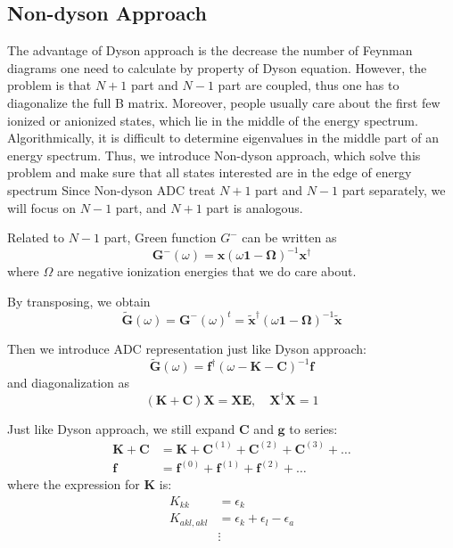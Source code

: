\subsection{Non-dyson Approach}
The advantage of Dyson approach is the decrease the number of Feynman diagrams one need to calculate by property of Dyson equation.
However, the problem is that $N+1$ part and $N-1$ part are coupled, thus one has to diagonalize the full B matrix.
Moreover, people usually care about the first few ionized or anionized states, which lie in the middle of the energy spectrum.
Algorithmically, it is difficult to determine eigenvalues in the middle part of an energy spectrum.
Thus, we introduce Non-dyson approach, which solve this problem and make sure that all states interested are in the edge of energy spectrum
Since Non-dyson ADC treat $N+1$ part and $N-1$ part separately, we will focus on $N-1$ part, and $N+1$ part is analogous.

Related to $N-1$ part, Green function $G^{-}$ can be written as
\begin{equation}
	\boldsymbol{G}^{-}(\omega)=\boldsymbol{x}(\omega \mathbf{1}-\boldsymbol{\Omega})^{-1} \boldsymbol{x}^{\dagger}
\end{equation}
where $\Omega$ are negative ionization energies that we do care about.

By transposing, we obtain
\begin{equation}
	\tilde{\boldsymbol{G}}(\omega)=\boldsymbol{G}^{-}(\omega)^{t}=\tilde{\boldsymbol{x}}^{\dagger}(\omega \mathbf{1}-\boldsymbol{\Omega})^{-1} \tilde{\boldsymbol{x}}
\end{equation}

Then we introduce ADC representation just like Dyson approach:
\begin{equation}
	\tilde{\boldsymbol{G}}(\omega)=\boldsymbol{f}^{\dagger}(\omega-\boldsymbol{K}-\boldsymbol{C})^{-1} \boldsymbol{f}
\end{equation}
and diagonalization as
\begin{equation} \label{KCeigen}
	(\boldsymbol{K}+\boldsymbol{C}) \boldsymbol{X}=\boldsymbol{X} \boldsymbol{E}, \quad \boldsymbol{X}^{\dagger} \boldsymbol{X}=1
\end{equation}

Just like Dyson approach, we still expand $\boldsymbol{C}$ and $\boldsymbol{g}$ to series:
\begin{equation}
	\begin{aligned} \boldsymbol{K}+\boldsymbol{C} &=\boldsymbol{K}+\boldsymbol{C}^{(1)}+\boldsymbol{C}^{(2)}+\boldsymbol{C}^{(3)}+\ldots \\ \boldsymbol{f} &=\boldsymbol{f}^{(0)}+\boldsymbol{f}^{(1)}+\boldsymbol{f}^{(2)}+\ldots \end{aligned}
\end{equation}
where the expression for $\boldsymbol{K}$ is:
\begin{equation}
	\begin{aligned} K_{k k} &=\epsilon_{k} \\ K_{a k l, a k l} &=\epsilon_{k}+\epsilon_{l}-\epsilon_{a} \\ & \vdots \end{aligned}
\end{equation}

